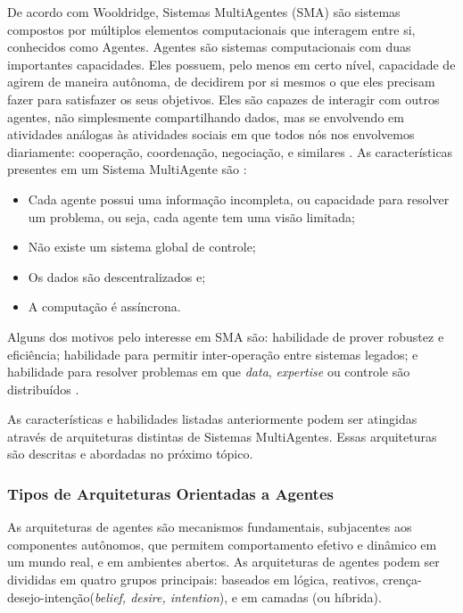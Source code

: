 De acordo com Wooldridge, Sistemas MultiAgentes (SMA) são sistemas compostos por múltiplos elementos computacionais que interagem entre si, conhecidos como Agentes. Agentes são sistemas computacionais com duas importantes capacidades. Eles possuem, pelo menos em certo nível, capacidade de agirem de maneira autônoma, de decidirem por si mesmos o que eles precisam fazer para satisfazer os seus objetivos. Eles são capazes de interagir com outros agentes, não simplesmente compartilhando dados,  mas se envolvendo em atividades análogas às atividades sociais em que todos nós nos envolvemos diariamente: cooperação, coordenação, negociação, e similares \cite{wooldridge2009}. As características presentes em um Sistema MultiAgente são  \cite{jennings1998}:

\begin{itemize}
  \item Cada agente possui uma informação incompleta, ou capacidade para resolver um problema, ou seja, cada agente tem uma visão limitada;
  \item Não existe um sistema global de controle;
  \item Os dados são descentralizados e;
  \item A computação é assíncrona.
\end{itemize}

Alguns dos motivos pelo interesse em SMA são: habilidade de prover robustez e eficiência; habilidade para permitir inter-operação entre sistemas legados; e habilidade para resolver problemas em que \textit{data}, \textit{expertise} ou controle são distribuídos \cite{jennings1998}.

As características e habilidades listadas anteriormente podem ser atingidas
através de arquiteturas distintas de Sistemas MultiAgentes.
Essas arquiteturas são descritas e abordadas no próximo tópico.

    \subsubsection{Tipos de Arquiteturas Orientadas a Agentes}

As arquiteturas de agentes são mecanismos fundamentais, subjacentes aos componentes autônomos, que permitem comportamento efetivo e dinâmico em um mundo real, e em ambientes abertos. As arquiteturas de agentes podem ser divididas em quatro grupos principais: baseados em lógica, reativos, crença-desejo-intenção(\textit{belief, desire, intention}), e em camadas (ou híbrida)\cite{fabio2007}.

